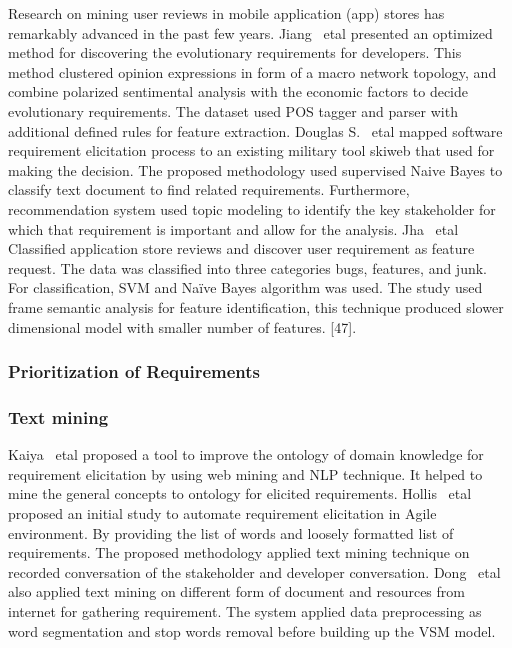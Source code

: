Research on mining user reviews in mobile application (app) stores has remarkably advanced in the past few years. Jiang ~etal \cite{Jiang:2014} presented an optimized method for discovering the evolutionary requirements for developers. This method clustered opinion expressions in form of a macro network topology, and combine polarized sentimental analysis with the economic factors to decide evolutionary requirements. The dataset used POS tagger and parser with additional defined rules for feature extraction. Douglas S. ~etal \cite{Douglas:S2008} mapped software requirement elicitation process to an existing military tool skiweb that used for making the decision. The proposed methodology used supervised Naive Bayes to classify text document to find related requirements. Furthermore, recommendation system used topic modeling to identify the key stakeholder for which that requirement is important and allow for the analysis. Jha ~etal \cite{Jha:2017} Classified application store reviews and discover user requirement as feature request. The data was classified into three categories bugs, features, and junk. For classification, SVM and Naïve Bayes algorithm was used. The study used frame semantic analysis for feature identification, this technique produced slower dimensional model with smaller number of features. [47]. \\

\subsubsection{Prioritization of Requirements} 

\subsubsection{Text mining}
Kaiya ~etal \cite {Kaiya:2010} proposed a tool to improve the ontology of domain knowledge for requirement elicitation by using web mining and NLP technique. It helped to mine the general concepts to ontology for elicited requirements. Hollis ~etal               \cite{Hollis2017} proposed an initial study to automate requirement elicitation in Agile environment. By providing the list of words and loosely formatted list of requirements. The proposed methodology applied text mining technique on recorded conversation of the stakeholder and developer conversation. Dong ~etal \cite{dong2010}  also applied text mining on different form of  document and resources from internet for  gathering requirement. The system applied data preprocessing as word segmentation and stop words removal before building up the VSM model.
